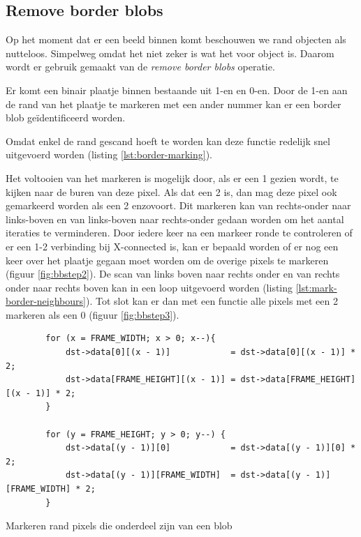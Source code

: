 \subsection{Remove border blobs}
\label{sec:remove-border}

Op het moment dat er een beeld binnen komt beschouwen we rand objecten als
nutteloos. Simpelweg omdat het niet zeker is wat het voor object is. Daarom
wordt er gebruik gemaakt van de \emph{remove border blobs} operatie.

Er komt een binair plaatje binnen bestaande uit 1-en en 0-en. Door de 1-en
aan de rand van het plaatje te markeren met een ander nummer kan er een
border blob geïdentificeerd worden.

Omdat enkel de rand gescand hoeft te worden kan deze functie redelijk snel
uitgevoerd worden (listing \ref{lst:border-marking}).

Het voltooien van het markeren is mogelijk door, als er een 1 gezien wordt,
te kijken naar de buren van deze pixel. Als dat een 2 is, dan mag deze pixel
ook gemarkeerd worden als een 2 enzovoort. Dit markeren kan van rechts-onder
naar links-boven en van links-boven naar rechts-onder gedaan worden om het
aantal iteraties te verminderen. Door iedere keer na een markeer ronde te
controleren of er een 1-2 verbinding bij X-connected is, kan er bepaald worden
of er nog een keer over het plaatje gegaan moet worden om de overige pixels te
markeren (figuur \ref{fig:bbstep2}). De scan van links boven naar rechts onder
en van rechts onder naar rechts boven kan in een loop uitgevoerd worden (listing
\ref{lst:mark-border-neighbours}). Tot slot kan er dan met een functie alle
pixels met een 2 markeren als een 0 (figuur \ref{fig:bbstep3}).


\begin{listing}
    \begin{verbatim}
        for (x = FRAME_WIDTH; x > 0; x--){
            dst->data[0][(x - 1)]            = dst->data[0][(x - 1)] * 2;
            dst->data[FRAME_HEIGHT][(x - 1)] = dst->data[FRAME_HEIGHT][(x - 1)] * 2;
        }

        for (y = FRAME_HEIGHT; y > 0; y--) {
            dst->data[(y - 1)][0]            = dst->data[(y - 1)][0] * 2;
            dst->data[(y - 1)][FRAME_WIDTH]  = dst->data[(y - 1)][FRAME_WIDTH] * 2;
        }
    \end{verbatim}
    \caption{Markeren rand pixels die onderdeel zijn van een blob}
    \label{lst:border-marking}
\end{listing}

